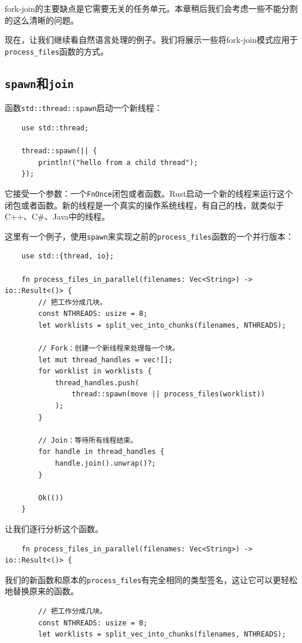 fork-join的主要缺点是它需要无关的任务单元。本章稍后我们会考虑一些不能分割的这么清晰的问题。

现在，让我们继续看自然语言处理的例子。我们将展示一些将fork-join模式应用于\texttt{process\_files}函数的方式。

\subsection{\texttt{spawn}和\texttt{join}}
函数\texttt{std::thread::spawn}启动一个新线程：
\begin{verbatim}
    use std::thread;

    thread::spawn(|| {
        println!("hello from a child thread");
    });
\end{verbatim}

它接受一个参数：一个\texttt{FnOnce}闭包或者函数。Rust启动一个新的线程来运行这个闭包或者函数。新的线程是一个真实的操作系统线程，有自己的栈，就类似于C++、C\#、Java中的线程。

这里有一个例子，使用\texttt{spawn}来实现之前的\texttt{process\_files}函数的一个并行版本：
\begin{verbatim}
    use std::{thread, io};

    fn process_files_in_parallel(filenames: Vec<String>) -> io::Result<()> {
        // 把工作分成几块。
        const NTHREADS: usize = 8;
        let worklists = split_vec_into_chunks(filenames, NTHREADS);

        // Fork：创建一个新线程来处理每一个块。
        let mut thread_handles = vec![];
        for worklist in worklists {
            thread_handles.push(
                thread::spawn(move || process_files(worklist))
            );
        }

        // Join：等待所有线程结束。
        for handle in thread_handles {
            handle.join().unwrap()?;
        }

        Ok(())
    }
\end{verbatim}

让我们逐行分析这个函数。
\begin{verbatim}
    fn process_files_in_parallel(filenames: Vec<String>) -> io::Result<()> {
\end{verbatim}

我们的新函数和原本的\texttt{process\_files}有完全相同的类型签名，这让它可以更轻松地替换原来的函数。

\begin{verbatim}
        // 把工作分成几块。
        const NTHREADS: usize = 8;
        let worklists = split_vec_into_chunks(filenames, NTHREADS);
\end{verbatim}


